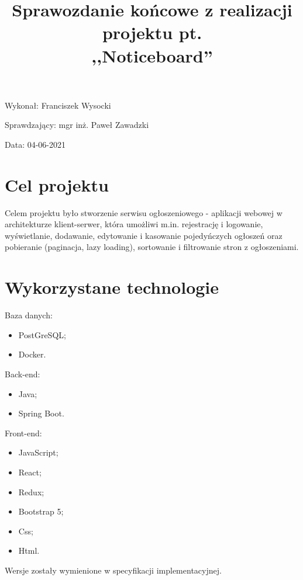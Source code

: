 \documentclass{article}
\title{Sprawozdanie końcowe z realizacji projektu pt. \\ ,,Noticeboard''}
\author{}
\date{}
\begin{document}
\maketitle

\begin{flushright}
\par
\vfill
\par
{\fontsize{11}{11}\selectfont
    Wykonał: Franciszek Wysocki

    Sprawdzający: mgr inż. Paweł Zawadzki

    Data: 04-06-2021
}
\end{flushright}
\thispagestyle{empty}

\newpage
{}
\tableofcontents

\newpage



\section{Cel projektu}

    Celem projektu było stworzenie serwisu ogłoszeniowego - aplikacji webowej w architekturze klient-serwer, która umożliwi m.in. rejestrację i logowanie, wyświetlanie, dodawanie, edytowanie i kasowanie pojedyńczych ogłoszeń  oraz pobieranie (paginacja, lazy loading), sortowanie i filtrowanie stron z ogłoszeniami.

\section{Wykorzystane technologie}
    Baza danych:
    \begin{itemize}
        \item PostGreSQL;
        \item Docker.
    \end{itemize}
    
    Back-end:
    \begin{itemize}
        \item Java;
        \item Spring Boot.
    \end{itemize}
    
    Front-end:
        \begin{itemize}
        \item JavaScript;
        \item React;
        \item Redux;
        \item Bootstrap 5;
        \item Css;
        \item Html.
    \end{itemize}
    Wersje zostały wymienione  w specyfikacji implementacyjnej.
    
\end{document}
